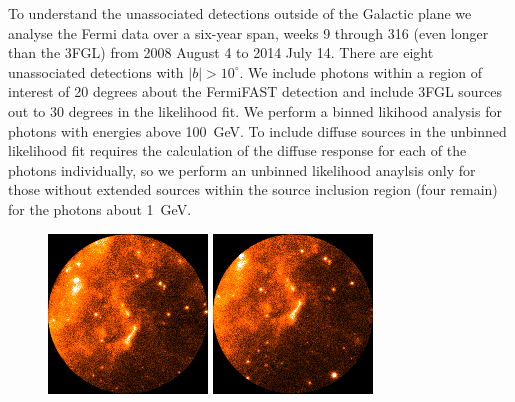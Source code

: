\documentclass[useAMS,usenatbib]{mn2e}
\begin{document}
To understand the unassociated detections outside of the Galactic plane
we analyse the Fermi data over a six-year span, weeks 9 through 316
(even longer than the 3FGL) from 2008 August 4 to 2014 July 14. There
are eight unassociated detections with $|b|>10^{\circ}$.  We
include photons within a region of interest of 20 degrees about the
FermiFAST detection and include 3FGL sources out to 30 degrees in the
likelihood fit. We perform a binned likihood analysis for photons with
energies above 100~GeV.  To include diffuse sources in the unbinned
likelihood fit requires the calculation of the diffuse response for
each of the photons individually, so we perform an unbinned likelihood
anaylsis only for those without extended sources within the source
inclusion region (four remain) for the photons about 1~GeV.
\begin{figure}
  \includegraphics[width=0.45\columnwidth]{src_18_1GeV}
  \includegraphics[width=0.45\columnwidth]{src_20_1GeV}


\end{figure}
\end{document}
